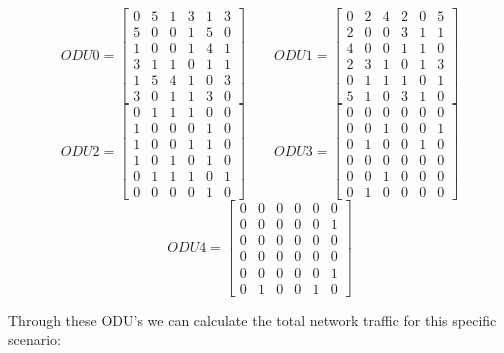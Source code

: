 \[
ODU0=
\begin{bmatrix}
0 & 5 & 1 & 3 & 1 & 3 \\
5 & 0 & 0 & 1 & 5 & 0 \\
1 & 0 & 0 & 1 & 4 & 1 \\
3 & 1 & 1 & 0 & 1 & 1 \\
1 & 5 & 4 & 1 & 0 & 3 \\
3 & 0 & 1 & 1 & 3 & 0
\end{bmatrix}
\qquad ODU1=
\begin{bmatrix}
0 & 2 & 4 & 2 & 0 & 5 \\
2 & 0 & 0 & 3 & 1 & 1 \\
4 & 0 & 0 & 1 & 1 & 0 \\
2 & 3 & 1 & 0 & 1 & 3 \\
0 & 1 & 1 & 1 & 0 & 1 \\
5 & 1 & 0 & 3 & 1 & 0
\end{bmatrix}
\]
\[
ODU2=
\begin{bmatrix}
0 & 1 & 1 & 1 & 0 & 0 \\
1 & 0 & 0 & 0 & 1 & 0 \\
1 & 0 & 0 & 1 & 1 & 0 \\
1 & 0 & 1 & 0 & 1 & 0 \\
0 & 1 & 1 & 1 & 0 & 1 \\
0 & 0 & 0 & 0 & 1 & 0
\end{bmatrix}
\qquad ODU3=
\begin{bmatrix}
0 & 0 & 0 & 0 & 0 & 0 \\
0 & 0 & 1 & 0 & 0 & 1 \\
0 & 1 & 0 & 0 & 1 & 0 \\
0 & 0 & 0 & 0 & 0 & 0 \\
0 & 0 & 1 & 0 & 0 & 0 \\
0 & 1 & 0 & 0 & 0 & 0
\end{bmatrix}
\]
\[
ODU4=
\begin{bmatrix}
0 & 0 & 0 & 0 & 0 & 0 \\
0 & 0 & 0 & 0 & 0 & 1 \\
0 & 0 & 0 & 0 & 0 & 0 \\
0 & 0 & 0 & 0 & 0 & 0 \\
0 & 0 & 0 & 0 & 0 & 1 \\
0 & 1 & 0 & 0 & 1 & 0
\end{bmatrix}
\]

\vspace{17pt}
Through these ODU's we can calculate the total network traffic for this specific scenario:\\

